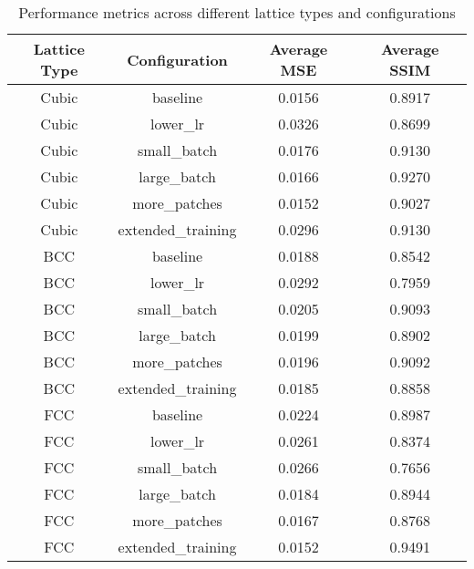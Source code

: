 \begin{table}[h]
\centering
\begin{tabular}{|c|c|c|c|}
\hline
Lattice Type & Configuration & Average MSE & Average SSIM \\
\hline
Cubic & baseline & 0.0156 & 0.8917 \\
\hline
Cubic & lower_lr & 0.0326 & 0.8699 \\
\hline
Cubic & small_batch & 0.0176 & 0.9130 \\
\hline
Cubic & large_batch & 0.0166 & 0.9270 \\
\hline
Cubic & more_patches & 0.0152 & 0.9027 \\
\hline
Cubic & extended_training & 0.0296 & 0.9130 \\
\hline
BCC & baseline & 0.0188 & 0.8542 \\
\hline
BCC & lower_lr & 0.0292 & 0.7959 \\
\hline
BCC & small_batch & 0.0205 & 0.9093 \\
\hline
BCC & large_batch & 0.0199 & 0.8902 \\
\hline
BCC & more_patches & 0.0196 & 0.9092 \\
\hline
BCC & extended_training & 0.0185 & 0.8858 \\
\hline
FCC & baseline & 0.0224 & 0.8987 \\
\hline
FCC & lower_lr & 0.0261 & 0.8374 \\
\hline
FCC & small_batch & 0.0266 & 0.7656 \\
\hline
FCC & large_batch & 0.0184 & 0.8944 \\
\hline
FCC & more_patches & 0.0167 & 0.8768 \\
\hline
FCC & extended_training & 0.0152 & 0.9491 \\
\hline
\end{tabular}
\caption{Performance metrics across different lattice types and configurations}
\label{tab:performance_metrics}
\end{table}